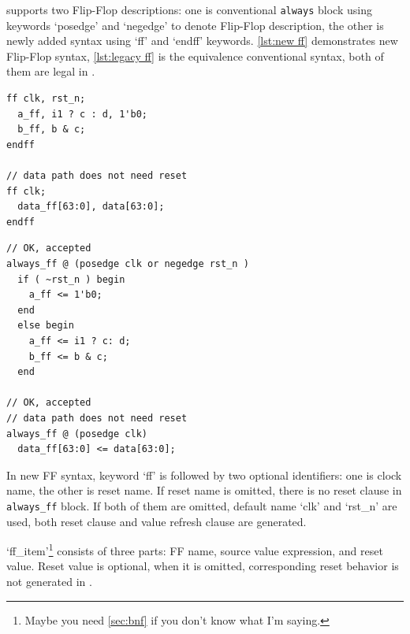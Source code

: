 \mhdl{} supports two Flip-Flop descriptions: 
one is conventional \texttt{always} 
block using keywords `posedge' and `negedge' to denote Flip-Flop
description, the other is newly added syntax using `ff' and `endff' keywords.
\autoref{lst:new ff} demonstrates new Flip-Flop syntax, 
\autoref{lst:legacy ff} is the equivalence conventional syntax, both of 
them are legal in \mhdlc{}. 

\begin{minipage}[t]{.45\textwidth}
\begin{lstlisting}[caption={\mhdl{} FF syntax}, label={lst:new ff}]
ff clk, rst_n;
  a_ff, i1 ? c : d, 1'b0;
  b_ff, b & c;
endff

// data path does not need reset
ff clk; 
  data_ff[63:0], data[63:0];
endff
\end{lstlisting}
\end{minipage}
\hspace{1ex}
\begin{minipage}[t]{.5\textwidth}
\begin{lstlisting}[caption={Legacy FF syntax},
label={lst:legacy ff}]
// OK, accepted
always_ff @ (posedge clk or negedge rst_n )
  if ( ~rst_n ) begin
    a_ff <= 1'b0;
  end
  else begin
    a_ff <= i1 ? c: d;
    b_ff <= b & c;
  end

// OK, accepted
// data path does not need reset
always_ff @ (posedge clk)
  data_ff[63:0] <= data[63:0];
\end{lstlisting}
\end{minipage}

In \mhdl{} new FF syntax, keyword `ff' is followed by two optional 
identifiers: one is clock name, the other is reset name. If reset
name is omitted, there is no reset clause in \texttt{always\_ff} 
block. If both of them are omitted, default name `clk' and `rst\_n' 
are used, both reset clause and value refresh clause are generated. 

`ff\_item'\footnote{Maybe you need \autoref{sec:bnf} if you don't know what I'm saying.} 
consists of three parts: FF name, source value expression, and
reset value. Reset value is optional, when it is omitted, corresponding reset behavior 
is not generated in \sv{}.


